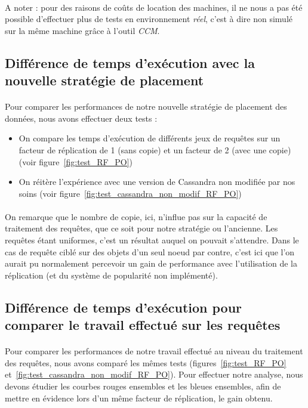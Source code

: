 \documentclass[12pt]{article}
\begin{document}
\paragraph{}A noter : pour des raisons de coûts de location des machines, il ne nous a pas été possible d'effectuer plus de tests en environnement \textit{réel}, c'est à dire non simulé sur la même machine grâce à l'outil \textit{CCM}.

\subsection{Différence de temps d'exécution avec la nouvelle stratégie de placement}

\paragraph{}Pour comparer les performances de notre nouvelle stratégie de placement des données, nous avons effectuer deux tests :

\begin{itemize}
    \item On compare les temps d'exécution de différents jeux de requêtes sur un facteur de réplication de 1 (sans copie) et un facteur de 2 (avec une copie) (voir figure~\ref{fig:test_RF_PO})
    \item On réitère l'expérience avec une version de Cassandra non modifiée par nos soins (voir figure~\ref{fig:test_cassandra_non_modif_RF_PO})
\end{itemize}

\paragraph{}On remarque que le nombre de copie, ici, n'influe pas sur la capacité de traitement des requêtes, que ce soit pour notre stratégie ou l'ancienne. Les requêtes étant uniformes, c'est un résultat auquel on pouvait s'attendre. Dans le cas de requête ciblé sur des objets d'un seul noeud par contre, c'est ici que l'on aurait pu normalement percevoir un gain de performance avec l'utilisation de la réplication (et du système de popularité non implémenté).

\subsection{Différence de temps d'exécution pour comparer le travail effectué sur les requêtes}

\paragraph{}Pour comparer les performances de notre travail effectué au niveau du traitement des requêtes, nous avons comparé les mêmes tests (figures~\ref{fig:test_RF_PO} et~\ref{fig:test_cassandra_non_modif_RF_PO}). Pour effectuer notre analyse, nous devons étudier les courbes rouges ensembles et les bleues ensembles, afin de mettre en évidence lors d'un même facteur de réplication, le gain obtenu.
\end{document}
